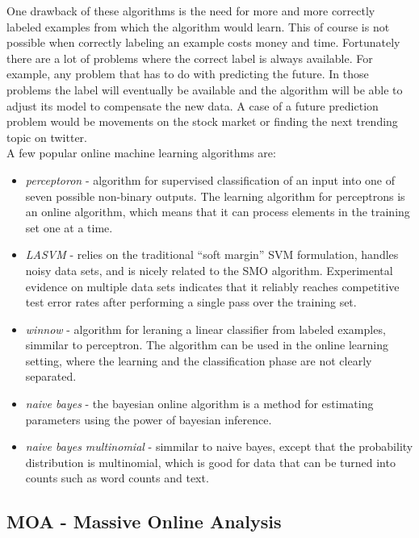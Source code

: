 \documentclass[journal]{IEEEtran/IEEEtran}
\begin{document}
One drawback of these algorithms is the need for more and more correctly labeled examples from which the algorithm would learn. This of course is not possible when correctly labeling an example costs money and time. Fortunately there are a lot of problems where the correct label is always available. For example, any problem that has to do with predicting the future. In those problems the label will eventually be available and the algorithm will be able to adjust its model to compensate the new data. A case of a future prediction problem would be movements on the stock market or finding the next trending topic on twitter. \\

A few popular online machine learning algorithms are:\\
\begin{itemize}
    \item \textit{perceptoron} - algorithm for supervised classification of an input into one of seven possible non-binary outputs. The learning algorithm for perceptrons is an online algorithm, which means that it can process elements in the training set one at a time.\\
    \item \textit{LASVM} - relies on the traditional “soft margin” SVM formulation, handles noisy data sets, and is nicely related to the SMO algorithm. Experimental evidence on multiple data sets indicates that it reliably reaches competitive test error rates after performing a single pass over the training set.\\
    \item \textit{winnow} - algorithm for leraning a linear classifier from labeled examples, simmilar to perceptron. The algorithm can be used in the online learning setting, where the learning and the classification phase are not clearly separated.\\
    \item \textit{naive bayes} - the bayesian online algorithm is a method for estimating parameters using the power of bayesian inference.\\
    \item \textit{naive bayes multinomial} - simmilar to naive bayes, except that the probability distribution is multinomial, which is good for data that can be turned into counts such as word counts and text.
\end{itemize}



\subsection{MOA - Massive Online Analysis}
\end{document}
